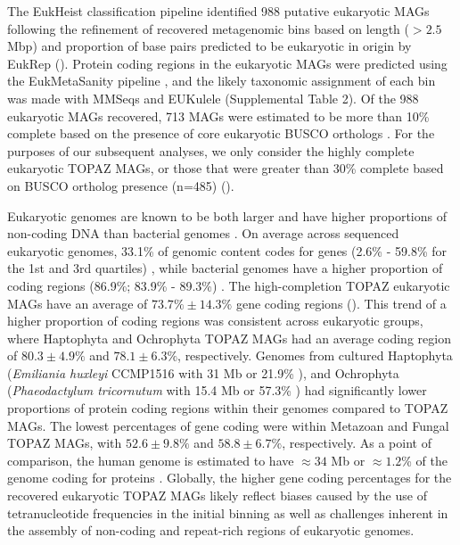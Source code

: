 \documentclass[12pt]{article}
\numberwithin{equation}{section}
\begin{document}
The EukHeist classification pipeline identified 988 putative eukaryotic MAGs following the refinement of recovered metagenomic bins based on length ($>2.5$ Mbp) and proportion of base pairs predicted to be eukaryotic in origin by EukRep \citep{West2018Genome-reconstruction} (). Protein coding regions in the eukaryotic MAGs were predicted using the EukMetaSanity pipeline \citep{EukMS}, and the likely taxonomic assignment of each bin was made with MMSeqs \citep{Steinegger2018} and EUKulele \citep{Krinos2021EUKulele} (Supplemental Table 2). Of the 988 eukaryotic MAGs recovered, 713 MAGs were estimated to be more than 10\% complete based on the presence of core eukaryotic BUSCO orthologs \citep{Simao2015BUSCO}. For the purposes of our subsequent analyses, we only consider the highly complete eukaryotic TOPAZ MAGs, or those that were greater than 30\% complete based on BUSCO ortholog presence (n=485) (). 

Eukaryotic genomes are known to be both larger and have higher proportions of non-coding DNA than bacterial genomes \citep{Zhang2011practical}. On average across sequenced eukaryotic genomes, 33.1\% of genomic content codes for genes (2.6\% - 59.8\% for the 1st and 3rd quartiles) \citep{Hou_2009}, while bacterial genomes have a higher proportion of coding regions (86.9\%; 83.9\% - 89.3\%) \citep{Hou_2009}. The high-completion TOPAZ eukaryotic MAGs have an average of $73.7\% \pm 14.3\%$ gene coding regions (). This trend of a higher proportion of coding regions was consistent across eukaryotic groups, where Haptophyta and Ochrophyta TOPAZ MAGs had an average coding region of $80.3 \pm 4.9\%$ and $78.1 \pm 6.3\%$, respectively. Genomes from cultured Haptophyta (\textit{Emiliania huxleyi} CCMP1516 with 31 Mb or 21.9\% \citep{Read2013}), and Ochrophyta (\textit{Phaeodactylum tricornutum} with 15.4 Mb or 57.3\% \citep{Bowler_2008}) had significantly lower proportions of protein coding regions within their genomes compared to TOPAZ MAGs. The lowest percentages of gene coding were within Metazoan and Fungal TOPAZ MAGs, with $52.6\pm 9.8\%$ and  $58.8 \pm 6.7\%$, respectively. As a point of comparison, the human genome is estimated to have $\approx 34$ Mb or $\approx 1.2$\% of the  genome coding for proteins \citep{humangenome}. Globally, the higher gene coding percentages for the recovered eukaryotic TOPAZ MAGs likely reflect biases caused by the use of tetranucleotide frequencies in the initial binning \citep{Kang_2019} as well as challenges inherent in the assembly of non-coding and repeat-rich regions of eukaryotic genomes. 
\end{document}
